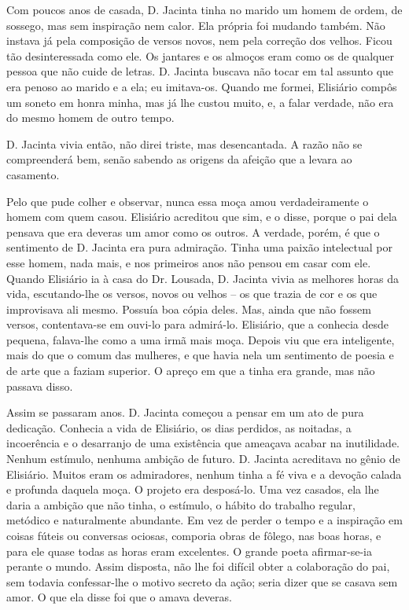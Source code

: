 Com poucos anos de casada, D. Jacinta tinha no marido um homem de ordem,
de sossego, mas sem inspiração nem calor. Ela própria foi mudando
também. Não instava já pela composição de versos novos, nem pela
correção dos velhos. Ficou tão desinteressada como ele. Os jantares e os
almoços eram como os de qualquer pessoa que não cuide de letras. D.
Jacinta buscava não tocar em tal assunto que era penoso ao marido e a
ela; eu imitava-os. Quando me formei, Elisiário compôs um soneto em
honra minha, mas já lhe custou muito, e, a falar verdade, não era do
mesmo homem de outro tempo.

D. Jacinta vivia então, não direi triste, mas desencantada. A razão não
se compreenderá bem, senão sabendo as origens da afeição que a levara ao
casamento.

Pelo que pude colher e observar, nunca essa moça amou verdadeiramente o
homem com quem casou. Elisiário acreditou que sim, e o disse, porque o
pai dela pensava que era deveras um amor como os outros. A verdade,
porém, é que o sentimento de D. Jacinta era pura admiração. Tinha uma
paixão intelectual por esse homem, nada mais, e nos primeiros anos não
pensou em casar com ele. Quando Elisiário ia à casa do Dr. Lousada, D.
Jacinta vivia as melhores horas da vida, escutando-lhe os versos, novos
ou velhos -- os que trazia de cor e os que improvisava ali mesmo.
Possuía boa cópia deles. Mas, ainda que não fossem versos, contentava-se
em ouvi-lo para admirá-lo. Elisiário, que a conhecia desde pequena,
falava-lhe como a uma irmã mais moça. Depois viu que era inteligente,
mais do que o comum das mulheres, e que havia nela um sentimento de
poesia e de arte que a faziam superior. O apreço em que a tinha era
grande, mas não passava disso.

Assim se passaram anos. D. Jacinta começou a pensar em um ato de pura
dedicação. Conhecia a vida de Elisiário, os dias perdidos, as noitadas,
a incoerência e o desarranjo de uma existência que ameaçava acabar na
inutilidade. Nenhum estímulo, nenhuma ambição de futuro. D. Jacinta
acreditava no gênio de Elisiário. Muitos eram os admiradores, nenhum
tinha a fé viva e a devoção calada e profunda daquela moça. O projeto
era desposá-lo. Uma vez casados, ela lhe daria a ambição que não tinha,
o estímulo, o hábito do trabalho regular, metódico e naturalmente
abundante. Em vez de perder o tempo e a inspiração em coisas fúteis ou
conversas ociosas, comporia obras de fôlego, nas boas horas, e para ele
quase todas as horas eram excelentes. O grande poeta afirmar-se-ia
perante o mundo. Assim disposta, não lhe foi difícil obter a colaboração
do pai, sem todavia confessar-lhe o motivo secreto da ação; seria dizer
que se casava sem amor. O que ela disse foi que o amava deveras.


